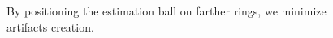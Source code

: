 \documentclass[smallextended]{svjour3}       %
\begin{document}
\begin{figure}[!h]
\begin{minipage}[b]{0.33\textwidth}
{	}%
\end{minipage}%
\begin{minipage}[b]{0.33\textwidth}
\end{minipage}%
\caption{By positioning the estimation ball on farther rings, we minimize artifacts creation. \label{fig:mx-square-flow}}
\end{figure}
\end{document}
